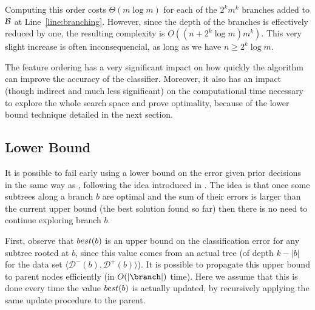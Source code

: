\documentclass{llncs}
\def\posclass{+}
\def\negclass{-}
\def\datasymb{D}
\newcommand{\setex}[1]{\ensuremath{{\mathcal \datasymb}^{#1}}\xspace}
\newcommand{\posex}{{\setex{\posclass}}\xspace}
\newcommand{\negex}{{\setex{\negclass}}\xspace}
\newcommand{\bud}[0]{\ensuremath{{\cal B}}}
\newcommand{\best}[1][]{\ensuremath{\ifthenelse{\equal{#1}{}}{{best}}{{best({#1})}}}}
\newcommand{\abranch}[0]{\ensuremath{b}}
\newcommand{\numex}[0]{\ensuremath{n}}
\newcommand{\numfeat}[0]{\ensuremath{m}}
\newcommand{\mdepth}[0]{\ensuremath{k}}
\begin{document}
Computing this order costs $\Theta(\numfeat \log \numfeat)$ for each of the $2^{\mdepth}\numfeat^{\mdepth}$ branches added to $\bud$ at Line~\ref{line:branching}. However, since the depth of the branches is effectively reduced by one, the resulting complexity 
is $O((\numex + 2^{\mdepth} \log \numfeat) \numfeat^{\mdepth})$. This very slight increase is often inconsequencial, as long as we have $\numex \geq 2^{\mdepth} \log \numfeat$.

The feature ordering has a very significant impact on how quickly the algorithm can improve the accuracy of the classifier. Moreover, it also has an impact (though indirect and much less significant) on the computational time necessary to explore the whole search space and prove optimality, because of the lower bound technique detailed in the next section.


\subsection{Lower Bound}
\label{sec:lb}

It is possible to fail early using a lower bound on the error given prior decisions in the same way as \murtree, following the idea introduced in \cite{dl8}. The idea is that once some subtrees along a branch $\abranch$ are optimal and the sum of their errors is larger than the current upper bound (the best solution found so far) then there is no need to continue exploring branch $\abranch$. 






First, observe that $\best[\abranch]$ is an upper bound on the classification error for any subtree rooted at $\abranch$, since this value comes from an actual tree (of depth $\mdepth - |\abranch|$ for the data set $\langle \negex(\abranch),\posex(\abranch) \rangle$). It is possible to propagate this upper bound to parent nodes efficiently (in $O(|\branch|)$ time). Here we assume that this is done every time the value $\best[\abranch]$ is actually updated, by recursively applying the same update procedure to the parent.
\end{document}
